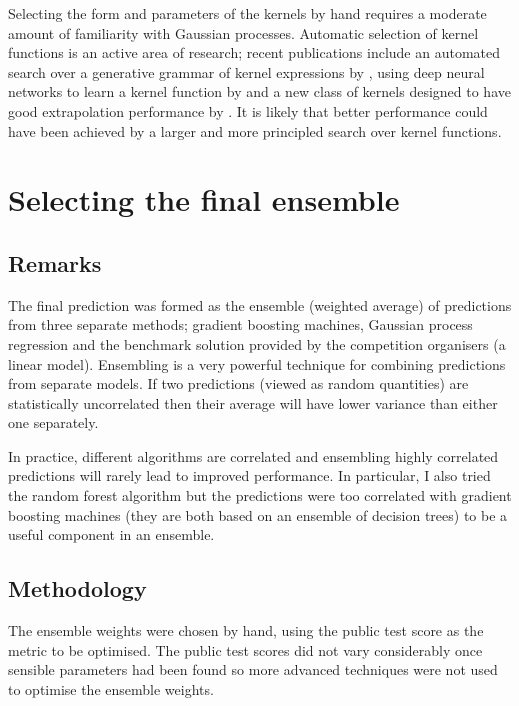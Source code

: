 \documentclass[preprint,authoryear,12pt]{elsarticle}
\begin{document}
Selecting the form and parameters of the kernels by hand requires a moderate amount of familiarity with Gaussian processes.
Automatic selection of kernel functions is an active area of research; recent publications include an automated search over a generative grammar of kernel expressions by \cite{duvenaud2013structure}, using deep neural networks to learn a kernel function by \cite{salakhutdinov2008using} and a new class of kernels designed to have good extrapolation performance by \cite{wilson2013gaussian}.
It is likely that better performance could have been achieved by a larger and more principled search over kernel functions.

\section{Selecting the final ensemble}

\subsection{Remarks}

The final prediction was formed as the ensemble (weighted average) of predictions from three separate methods; gradient boosting machines, Gaussian process regression and the benchmark solution provided by the competition organisers (a linear model).
Ensembling is a very powerful technique for combining predictions from separate models.
If two predictions (viewed as random quantities) are statistically uncorrelated then their average will have lower variance than either one separately.

In practice, different algorithms are correlated and ensembling highly correlated predictions will rarely lead to improved performance.
In particular, I also tried the random forest algorithm but the predictions were too correlated with gradient boosting machines (they are both based on an ensemble of decision trees) to be a useful component in an ensemble.

\subsection{Methodology}

The ensemble weights were chosen by hand, using the public test score as the metric to be optimised.
The public test scores did not vary considerably once sensible parameters had been found so more advanced techniques were not used to optimise the ensemble weights.
\end{document}
